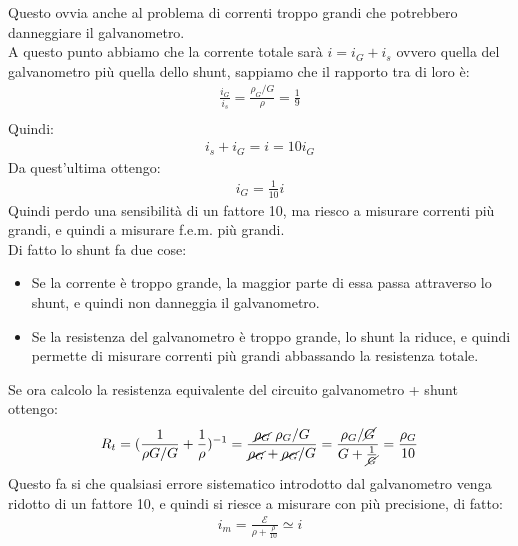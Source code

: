 \documentclass[a4paper, oneside]{article}
\newcommand{\E}{\mathcal{E}}
\begin{document}
Questo ovvia anche al problema di correnti troppo grandi che potrebbero danneggiare il galvanometro.\\
A questo punto abbiamo che la corrente totale sarà $i = i_G + i_s$ ovvero quella del galvanometro più quella dello shunt, sappiamo che il rapporto tra di loro è:
\begin{gather*}
    \frac{i_G}{i_s} = \frac{\rho_G/G}{\rho} = \frac{1}{9}\\
\end{gather*}
Quindi:
\begin{gather*}
    i_s + i_G = i = 10 i_G
\end{gather*}
Da quest'ultima ottengo:
\begin{gather*}
    \boxed{i_G = \frac{1}{10} i}
\end{gather*}
Quindi perdo una sensibilità di un fattore 10, ma riesco a misurare correnti più grandi, e quindi a misurare f.e.m. più grandi.\\
Di fatto lo shunt fa due cose:
\begin{itemize}
    \item Se la corrente è troppo grande, la maggior parte di essa passa attraverso lo shunt, e quindi non danneggia il galvanometro.
    \item Se la resistenza del galvanometro è troppo grande, lo shunt la riduce, e quindi permette di misurare correnti più grandi abbassando la resistenza totale.
\end{itemize}
Se ora calcolo la resistenza equivalente del circuito galvanometro + shunt ottengo:
\begin{gather*}
    R_t = (\frac{1}{\rho G/G} + \frac{1}{\rho})^{-1} = \frac{\cancel{\rho_G} \ \rho_G / G}{\cancel{\rho_G} + \cancel{\rho_G} / G} = \frac{\rho_G / \cancel{G}}{G + \frac{1}{\cancel{G}}} = \frac{\rho_G}{10}
\end{gather*}
Questo fa si che qualsiasi errore sistematico introdotto dal galvanometro venga ridotto di un fattore 10, e quindi si riesce a misurare con più precisione, di fatto:
\begin{gather*}
    i_m = \frac{\E}{\rho + \frac{\rho}{10}} \simeq i
\end{gather*}
\end{document}
